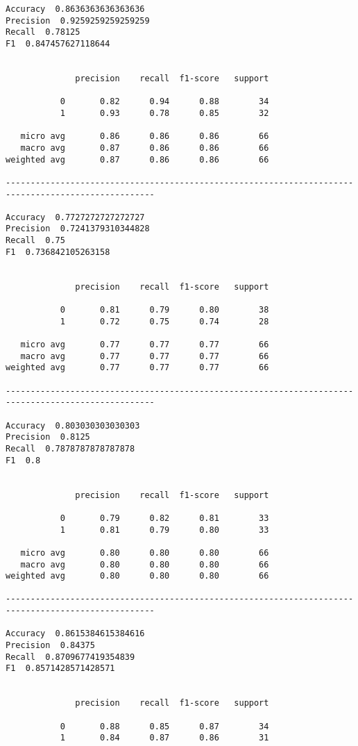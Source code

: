 \documentclass[11pt]{article}
\begin{document}
    \begin{Verbatim}[commandchars=\\\{\}]
Accuracy  0.8636363636363636
Precision  0.9259259259259259
Recall  0.78125
F1  0.847457627118644


              precision    recall  f1-score   support

           0       0.82      0.94      0.88        34
           1       0.93      0.78      0.85        32

   micro avg       0.86      0.86      0.86        66
   macro avg       0.87      0.86      0.86        66
weighted avg       0.87      0.86      0.86        66

---------------------------------------------------------------------------------------------------- 

Accuracy  0.7727272727272727
Precision  0.7241379310344828
Recall  0.75
F1  0.736842105263158


              precision    recall  f1-score   support

           0       0.81      0.79      0.80        38
           1       0.72      0.75      0.74        28

   micro avg       0.77      0.77      0.77        66
   macro avg       0.77      0.77      0.77        66
weighted avg       0.77      0.77      0.77        66

---------------------------------------------------------------------------------------------------- 

Accuracy  0.803030303030303
Precision  0.8125
Recall  0.7878787878787878
F1  0.8


              precision    recall  f1-score   support

           0       0.79      0.82      0.81        33
           1       0.81      0.79      0.80        33

   micro avg       0.80      0.80      0.80        66
   macro avg       0.80      0.80      0.80        66
weighted avg       0.80      0.80      0.80        66

---------------------------------------------------------------------------------------------------- 

Accuracy  0.8615384615384616
Precision  0.84375
Recall  0.8709677419354839
F1  0.8571428571428571


              precision    recall  f1-score   support

           0       0.88      0.85      0.87        34
           1       0.84      0.87      0.86        31


\end{Verbatim}
\end{document}
